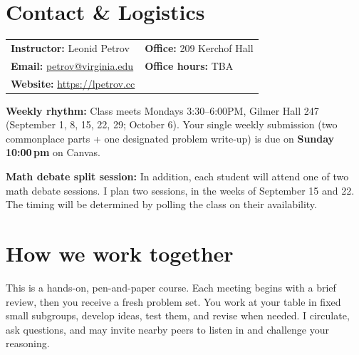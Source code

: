 \documentclass[oneside,11pt]{amsart}
\begin{document}
\newpage
\section{Contact \& Logistics}

\noindent
\begin{tabular}{ll}
\textbf{Instructor:} Leonid Petrov &\qquad \qquad \qquad\textbf{Office:} 209 Kerchof Hall \\
\textbf{Email:} \href{mailto:petrov@virginia.edu}{petrov@virginia.edu} & \qquad \qquad \qquad\textbf{Office hours:} TBA \\
\textbf{Website:} \url{https://lpetrov.cc}
\end{tabular}

\smallskip
\noindent\textbf{Weekly rhythm:} Class meets Mondays
3:30--6:00PM, Gilmer Hall 247
(September 1, 8, 15, 22, 29; October 6).
Your single weekly submission (two commonplace parts + one designated problem write-up) is due on \textbf{Sunday 10:00\,pm} on Canvas.

\smallskip
\noindent
\textbf{Math debate split session:} 
In addition, each student will attend one of two math debate sessions. I plan two
sessions, in the weeks of September 15 and 22. The timing will be 
determined by polling the class on their availability.

\section{How we work together}

This is a hands-on, pen-and-paper course. Each meeting begins with 
a brief review, then you receive
a fresh problem set. You work at your table in fixed small subgroups, develop ideas, test them, and revise when needed. I circulate, ask questions, and may invite nearby peers to listen in and challenge your reasoning.
\end{document}
